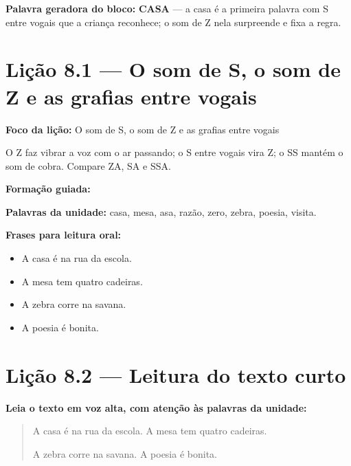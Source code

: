 \textbf{Palavra geradora do bloco:} \textbf{CASA} --- a casa é a primeira palavra com S entre vogais que a criança reconhece; o som de Z nela surpreende e fixa a regra.

\section{Lição 8.1 --- O som de S, o som de Z e as grafias entre vogais}

\textbf{Foco da lição:} O som de S, o som de Z e as grafias entre vogais


\begin{boquinha}
O Z faz vibrar a voz com o ar passando; o S entre vogais vira Z; o SS mantém o som de cobra. Compare ZA, SA e SSA.
\end{boquinha}

\noindent\textbf{Formação guiada:}

\begin{center}
\end{center}

\noindent\textbf{Palavras da unidade:} casa, mesa, asa, razão, zero, zebra, poesia, visita.

\noindent\textbf{Frases para leitura oral:}
\begin{itemize}[leftmargin=1.6em]
  \item A casa é na rua da escola.
  \item A mesa tem quatro cadeiras.
  \item A zebra corre na savana.
  \item A poesia é bonita.
\end{itemize}

\section{Lição 8.2 --- Leitura do texto curto}

\noindent\textbf{Leia o texto em voz alta, com atenção às palavras da unidade:}


\begin{quote}
A casa é na rua da escola. A mesa tem quatro cadeiras.

A zebra corre na savana. A poesia é bonita.
\end{quote}

